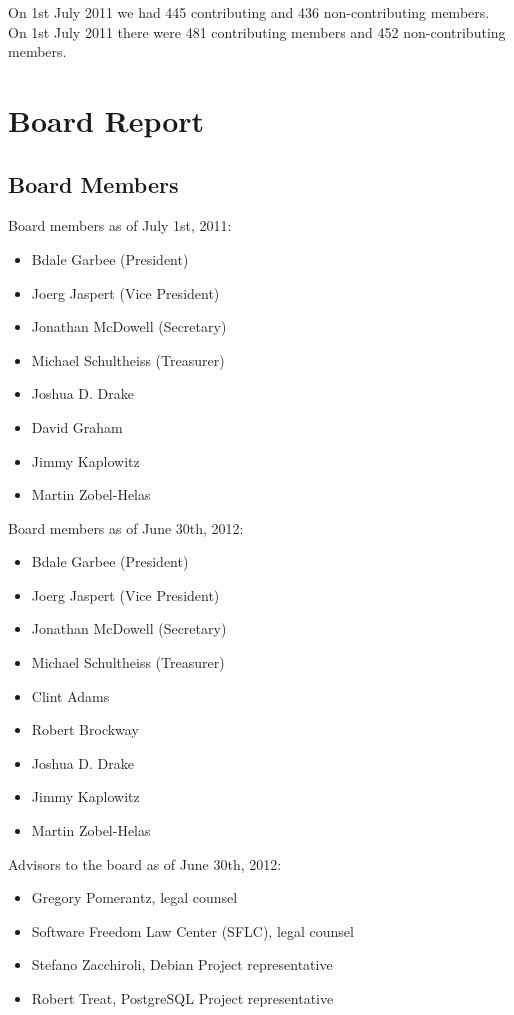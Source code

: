 \documentclass[letterpaper]{report}
\begin{document}
On 1st July 2011 we had 445 contributing and 436 non-contributing members. On
1st July 2011 there were 481 contributing members and 452 non-contributing
members.

\chapter{Board Report}
\section{Board Members}

Board members as of July 1st, 2011:

\begin{itemize}
\item Bdale Garbee (President)
\item Joerg Jaspert (Vice President)
\item Jonathan McDowell (Secretary)
\item Michael Schultheiss (Treasurer)
\item Joshua D. Drake
\item David Graham
\item Jimmy Kaplowitz
\item Martin Zobel-Helas
\end{itemize}

Board members as of June 30th, 2012:

\begin{itemize}
\item Bdale Garbee (President)
\item Joerg Jaspert (Vice President)
\item Jonathan McDowell (Secretary)
\item Michael Schultheiss (Treasurer)
\item Clint Adams
\item Robert Brockway
\item Joshua D. Drake
\item Jimmy Kaplowitz
\item Martin Zobel-Helas
\end{itemize}

Advisors to the board as of June 30th, 2012:

\begin{itemize}
\item Gregory Pomerantz, legal counsel
\item Software Freedom Law Center (SFLC), legal counsel
\item Stefano Zacchiroli, Debian Project representative
\item Robert Treat, PostgreSQL Project representative
\end{itemize}
\end{document}

